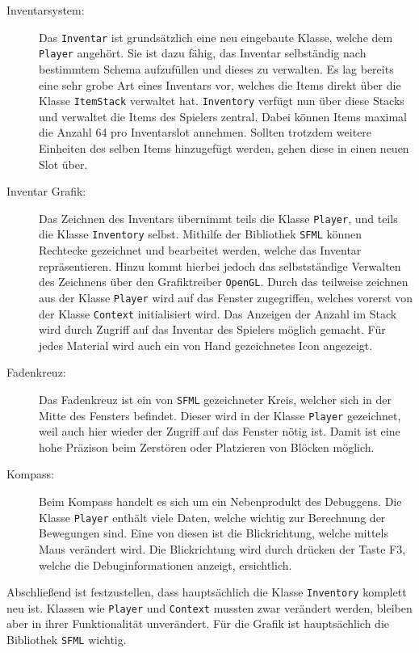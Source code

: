 \documentclass{article}
\begin{document}
\begin{description}
  \item[Inventarsystem:] Das \texttt{Inventar} ist grundsätzlich eine neu eingebaute Klasse, welche dem \texttt{Player} angehört. Sie ist dazu fähig, das Inventar selbständig nach bestimmtem Schema aufzufüllen und dieses zu verwalten. Es lag bereits eine sehr grobe Art eines Inventars vor, welches die Items direkt über die Klasse \texttt{ItemStack} verwaltet hat. \texttt{Inventory} verfügt nun über diese Stacks und verwaltet die Items des Spielers zentral. Dabei können Items maximal die Anzahl 64 pro Inventarslot annehmen. Sollten trotzdem weitere Einheiten des selben Items hinzugefügt werden, gehen diese in einen neuen Slot über.
  \item[Inventar Grafik:] Das Zeichnen des Inventars übernimmt teils die Klasse \linebreak[4]\texttt{Player}, und teils die Klasse \texttt{Inventory} selbst. Mithilfe der Bibliothek \texttt{SFML} können Rechtecke gezeichnet und bearbeitet werden, welche das Inventar repräsentieren. Hinzu kommt hierbei jedoch das selbstständige Verwalten des Zeichnens über den Grafiktreiber \texttt{OpenGL}. Durch das teilweise zeichnen aus der Klasse \texttt{Player} wird auf das Fenster zugegriffen, welches vorerst von der Klasse \texttt{Context} initialisiert wird. Das Anzeigen der Anzahl im Stack wird durch Zugriff auf das Inventar des Spielers möglich gemacht. Für jedes Material wird auch ein von Hand gezeichnetes Icon angezeigt.
  \item[Fadenkreuz:] Das Fadenkreuz ist ein von \texttt{SFML} gezeichneter Kreis, welcher sich in der Mitte des Fensters befindet. Dieser wird in der Klasse \texttt{Player} gezeichnet, weil auch hier wieder der Zugriff auf das Fenster nötig ist. Damit ist eine hohe Präzison beim Zerstören oder Platzieren von Blöcken möglich.
  \item[Kompass:] Beim Kompass handelt es sich um ein Nebenprodukt des Debuggens. Die Klasse \texttt{Player} enthält viele Daten, welche wichtig zur Berechnung der Bewegungen sind. Eine von diesen ist die Blickrichtung, welche mittels Maus verändert wird. Die Blickrichtung wird durch drücken der Taste F3, welche die Debuginformationen anzeigt, ersichtlich. 
\end{description}

Abschließend ist festzustellen, dass hauptsächlich die Klasse \texttt{Inventory} komplett neu ist. Klassen wie \texttt{Player} und \texttt{Context} mussten zwar verändert werden, bleiben aber in ihrer Funktionalität unverändert. Für die Grafik ist hauptsächlich die Bibliothek \texttt{SFML} wichtig.
\end{document}
